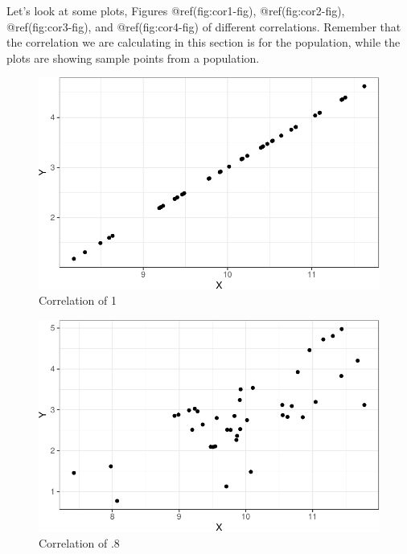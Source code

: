 \documentclass[
  letterpaper,
  DIV=11,
  numbers=noendperiod]{scrreprt}
\begin{document}
Let's look at some plots, Figures @ref(fig:cor1-fig),
@ref(fig:cor2-fig), @ref(fig:cor3-fig), and @ref(fig:cor4-fig) of
different correlations. Remember that the correlation we are calculating
in this section is for the population, while the plots are showing
sample points from a population.

\begin{figure}[H]

{\centering \includegraphics{15-Multivariate-Expectation_files/figure-pdf/cor1-fig-1.pdf}

}

\caption{Correlation of 1}

\end{figure}%

\begin{figure}[H]

{\centering \includegraphics{15-Multivariate-Expectation_files/figure-pdf/cor2-fig-1.pdf}

}

\caption{Correlation of .8}

\end{figure}%
\end{document}
